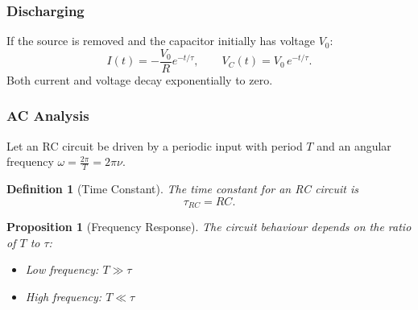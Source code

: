 \documentclass{article}
\newtheorem{definition}{Definition}
\newtheorem{proposition}{Proposition}
\begin{document}
\subsubsection*{Discharging}
If the source is removed and the capacitor initially has voltage $V_0$:
\[I(t) = -\frac{V_0}{R}e^{-t/\tau}, \qquad V_C(t) = V_0\,e^{-t/\tau}.\]
Both current and voltage decay exponentially to zero.
\begin{center}
\end{center}

\subsubsection{AC Analysis}
Let an RC circuit be driven by a periodic input with period $T$ and an angular frequency $\omega = \frac{2\pi}{T} = 2\pi\nu$.
\begin{definition}[Time Constant]
    The time constant for an RC circuit is
    \[\tau_{RC} = RC.\]
\end{definition}
\begin{proposition}[Frequency Response]
    The circuit behaviour depends on the ratio of $T$ to $\tau$:
    \begin{itemize}
        \item Low frequency: $T \gg \tau$
        \item High frequency: $T \ll \tau$
    \end{itemize}
\end{proposition}
\end{document}
